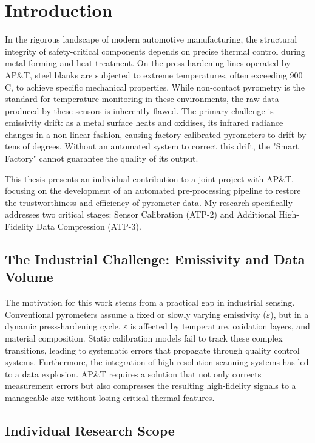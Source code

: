 \chapter{Introduction}

In the rigorous landscape of modern automotive manufacturing, the structural integrity of safety-critical components depends on precise thermal control during metal forming and heat treatment. On the press-hardening lines operated by AP\&T, steel blanks are subjected to extreme temperatures, often exceeding 900\,\textdegree C, to achieve specific mechanical properties. While non-contact pyrometry is the standard for temperature monitoring in these environments, the raw data produced by these sensors is inherently flawed. The primary challenge is emissivity drift: as a metal surface heats and oxidises, its infrared radiance changes in a non-linear fashion, causing factory-calibrated pyrometers to drift by tens of degrees. Without an automated system to correct this drift, the "Smart Factory" cannot guarantee the quality of its output.

This thesis presents an individual contribution to a joint project with AP\&T, focusing on the development of an automated pre-processing pipeline to restore the trustworthiness and efficiency of pyrometer data. My research specifically addresses two critical stages: Sensor Calibration (ATP-2) and Additional High-Fidelity Data Compression (ATP-3).

\section{The Industrial Challenge: Emissivity and Data Volume}
\label{sec:motivation}

The motivation for this work stems from a practical gap in industrial sensing. Conventional pyrometers assume a fixed or slowly varying emissivity ($\varepsilon$), but in a dynamic press-hardening cycle, $\varepsilon$ is affected by temperature, oxidation layers, and material composition. Static calibration models fail to track these complex transitions, leading to systematic errors that propagate through quality control systems. Furthermore, the integration of high-resolution scanning systems has led to a data explosion. AP\&T requires a solution that not only corrects measurement errors but also compresses the resulting high-fidelity signals to a manageable size without losing critical thermal features.

\section{Individual Research Scope}
\label{sec:individual_contribution}

